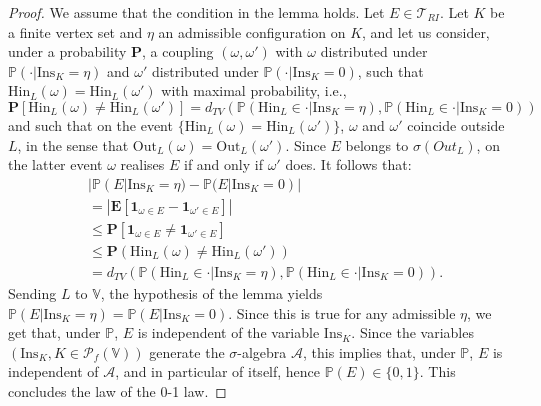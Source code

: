 \documentclass[12pt,a4paper]{article}
\newcommand{\1}[1]{{\mathbf 1}{\{#1\}}}
\newcommand{\8}{{\infty}}
\newcommand{\p}{\mathbb{P}}
\newcommand{\ind}{{\mathbf{1}}} %
\newcommand{\Out}{\mathrm{Out}}
\newcommand{\In}{\mathrm{Ins}}
\newcommand{\Hin}{\mathrm{Hin}}
\begin{document}
\begin{proof}
  We assume that the condition in the lemma holds. Let $E\in \mathcal{T}_{RI}$. Let $K$ be a finite vertex set and $\eta$ an admissible configuration on $K$, and let us consider, under a probability $\mathbf{P}$, a coupling $(\omega, \omega')$ with $\omega$ distributed under  $\mathbb{P}(\cdot | \In_K=\eta)$ and $\omega'$ distributed under $\mathbb{P}(\cdot | \In_K=0)$, such that $\Hin_L(\omega)=\Hin_L(\omega')$ with maximal probability, i.e.,
  \begin{equation}
    \mathbf{P}[\Hin_L(\omega) \neq \Hin_L(\omega')] =  
    d_{TV}\left(\mathbb{P}(\Hin_L \in \cdot | \In_K=\eta),
    \mathbb{P}(\Hin_L \in \cdot | \In_K=0) \right) 
  \end{equation}
  and such that on the event $\{\Hin_L(\omega)=\Hin_L(\omega')\}$, $\omega$ and $\omega'$ coincide outside $L$, in the sense that $\Out_L(\omega)= \Out_L(\omega')$. Since $E$ belongs to $\sigma(Out_L)$, on the latter event $\omega$ realises $E$ if and only if $\omega'$ does. It follows that:
  \begin{equation}
    \begin{aligned}
    & |\p(E|\In_K = \eta)  - \p(E|\In_K  = 0)| \\
    & = |\mathbf{E}[ \ind_{\omega \in E} - \ind_{\omega' \in E} ]| \\
    & \le \mathbf{P}[ \ind_{\omega \in E} \neq  \ind_{\omega' \in E} ] \\
    & \le \mathbf{P}(\Hin_L(\omega ) \neq \Hin_L(\omega'))\\
    & = d_{TV}\left(\mathbb{P}(\Hin_L \in \cdot | \In_K=\eta),
    \mathbb{P}(\Hin_L \in \cdot | \In_K=0) \right) .
    \end{aligned}
  \end{equation}
  Sending $L$ to $\mathbb{V}$, the hypothesis of the lemma yields $\p(E|\In_K= \eta) = \p(E|\In_K=0)$. 
  Since this is true for any admissible $\eta$, we get that, under $\p$, $E$ is independent of the variable $\In_K$.  
  Since the variables $(\In_K, K\in \mathcal{P}_f(\mathbb{V}))$ generate the $\sigma$-algebra $\mathcal{A}$, this implies that, under $\p$, $E$ is independent of $\mathcal{A}$, and in particular of itself, hence $\p(E) \in \{0 , 1\}$. This concludes the law of the 0-1 law.

  \smallskip 


\end{proof}
\end{document}
